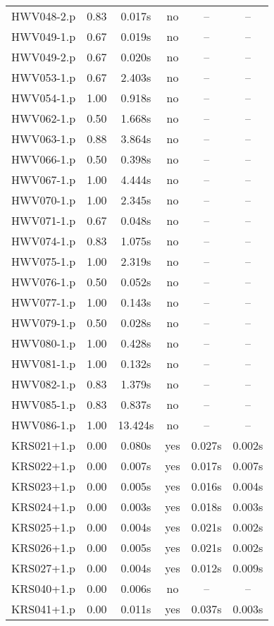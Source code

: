 \begin{longtable}{||c | c | c | c | c | c||}
HWV048-2.p & 0.83 & 0.017s & no & -- & -- \\
HWV049-1.p & 0.67 & 0.019s & no & -- & -- \\
HWV049-2.p & 0.67 & 0.020s & no & -- & -- \\
HWV053-1.p & 0.67 & 2.403s & no & -- & -- \\
HWV054-1.p & 1.00 & 0.918s & no & -- & -- \\
HWV062-1.p & 0.50 & 1.668s & no & -- & -- \\
HWV063-1.p & 0.88 & 3.864s & no & -- & -- \\
HWV066-1.p & 0.50 & 0.398s & no & -- & -- \\
HWV067-1.p & 1.00 & 4.444s & no & -- & -- \\
HWV070-1.p & 1.00 & 2.345s & no & -- & -- \\
HWV071-1.p & 0.67 & 0.048s & no & -- & -- \\
HWV074-1.p & 0.83 & 1.075s & no & -- & -- \\
HWV075-1.p & 1.00 & 2.319s & no & -- & -- \\
HWV076-1.p & 0.50 & 0.052s & no & -- & -- \\
HWV077-1.p & 1.00 & 0.143s & no & -- & -- \\
HWV079-1.p & 0.50 & 0.028s & no & -- & -- \\
HWV080-1.p & 1.00 & 0.428s & no & -- & -- \\
HWV081-1.p & 1.00 & 0.132s & no & -- & -- \\
HWV082-1.p & 0.83 & 1.379s & no & -- & -- \\
HWV085-1.p & 0.83 & 0.837s & no & -- & -- \\
HWV086-1.p & 1.00 & 13.424s & no & -- & -- \\
KRS021+1.p & 0.00 & 0.080s & yes & 0.027s & 0.002s \\
KRS022+1.p & 0.00 & 0.007s & yes & 0.017s & 0.007s \\
KRS023+1.p & 0.00 & 0.005s & yes & 0.016s & 0.004s \\
KRS024+1.p & 0.00 & 0.003s & yes & 0.018s & 0.003s \\
KRS025+1.p & 0.00 & 0.004s & yes & 0.021s & 0.002s \\
KRS026+1.p & 0.00 & 0.005s & yes & 0.021s & 0.002s \\
KRS027+1.p & 0.00 & 0.004s & yes & 0.012s & 0.009s \\
KRS040+1.p & 0.00 & 0.006s & no & -- & -- \\
KRS041+1.p & 0.00 & 0.011s & yes & 0.037s & 0.003s \\

\end{longtable}
